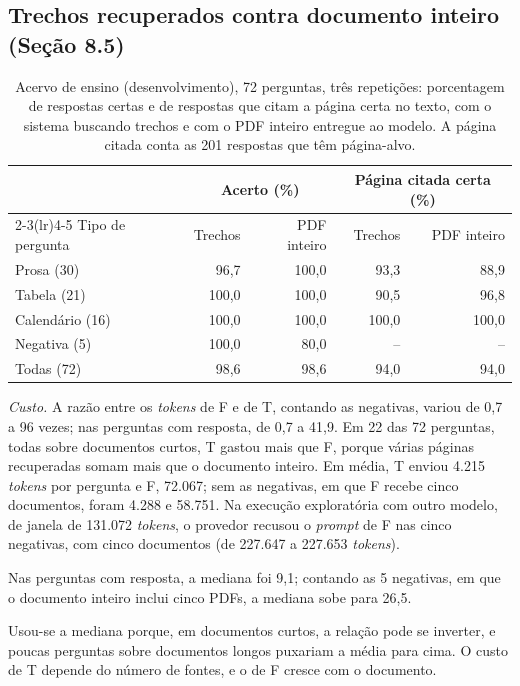 \documentclass[12pt]{article}
\begin{document}
\subsection*{Trechos recuperados contra documento inteiro (Seção 8.5)}

\begin{table}[!htbp]
\centering
\caption{Acervo de ensino (desenvolvimento), 72 perguntas, três repetições: porcentagem de respostas certas e de respostas que citam a página certa no texto, com o sistema buscando trechos e com o PDF inteiro entregue ao modelo. A página citada conta as 201 respostas que têm página-alvo.}
\label{apoio:geracao}
\begin{tabular}{lrrrr}
\toprule
 & \multicolumn{2}{c}{Acerto (\%)} & \multicolumn{2}{c}{Página citada certa (\%)} \\
\cmidrule(lr){2-3}\cmidrule(lr){4-5}
Tipo de pergunta & Trechos & PDF inteiro & Trechos & PDF inteiro \\
\midrule
Prosa (30)      & 96,7 & 100,0 & 93,3 & 88,9 \\
Tabela (21)     & 100,0 & 100,0 & 90,5 & 96,8 \\
Calendário (16) & 100,0 & 100,0 & 100,0 & 100,0 \\
Negativa (5)    & 100,0 & 80,0 & -- & -- \\
\midrule
Todas (72)      & 98,6 & 98,6 & 94,0 & 94,0 \\
\bottomrule
\end{tabular}
\end{table}

\textit{Custo.} A razão entre os \emph{tokens} de F e de T, contando as negativas, variou de 0{,}7 a 96 vezes; nas perguntas com resposta, de 0{,}7 a 41{,}9. Em 22 das 72 perguntas, todas sobre documentos curtos, T gastou mais que F, porque várias páginas recuperadas somam mais que o documento inteiro. Em média, T enviou 4.215 \emph{tokens} por pergunta e F, 72.067; sem as negativas, em que F recebe cinco documentos, foram 4.288 e 58.751. Na execução exploratória com outro modelo, de janela de 131.072 \emph{tokens}, o provedor recusou o \emph{prompt} de F nas cinco negativas, com cinco documentos (de 227.647 a 227.653 \emph{tokens}).

Nas perguntas com resposta, a mediana foi 9,1; contando as 5 negativas, em que o documento inteiro inclui cinco PDFs, a mediana sobe para 26,5.

Usou-se a mediana porque, em documentos curtos, a relação pode se inverter, e poucas perguntas sobre documentos longos puxariam a média para cima. O custo de T depende do número de fontes, e o de F cresce com o documento.
\end{document}
